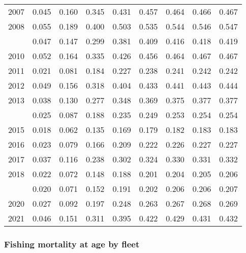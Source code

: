 \documentclass[
]{article}
\begin{document}
\begin{longtable}[t]{lrrrrrrrr}
2007 & 0.045 & 0.160 & 0.345 & 0.431 & 0.457 & 0.464 & 0.466 & 0.467\\
2008 & 0.055 & 0.189 & 0.400 & 0.503 & 0.535 & 0.544 & 0.546 & 0.547\\
\addlinespace
2009 & 0.047 & 0.147 & 0.299 & 0.381 & 0.409 & 0.416 & 0.418 & 0.419\\
2010 & 0.052 & 0.164 & 0.335 & 0.426 & 0.456 & 0.464 & 0.467 & 0.467\\
2011 & 0.021 & 0.081 & 0.184 & 0.227 & 0.238 & 0.241 & 0.242 & 0.242\\
2012 & 0.049 & 0.156 & 0.318 & 0.404 & 0.433 & 0.441 & 0.443 & 0.444\\
2013 & 0.038 & 0.130 & 0.277 & 0.348 & 0.369 & 0.375 & 0.377 & 0.377\\
\addlinespace
2014 & 0.025 & 0.087 & 0.188 & 0.235 & 0.249 & 0.253 & 0.254 & 0.254\\
2015 & 0.018 & 0.062 & 0.135 & 0.169 & 0.179 & 0.182 & 0.183 & 0.183\\
2016 & 0.023 & 0.079 & 0.166 & 0.209 & 0.222 & 0.226 & 0.227 & 0.227\\
2017 & 0.037 & 0.116 & 0.238 & 0.302 & 0.324 & 0.330 & 0.331 & 0.332\\
2018 & 0.022 & 0.072 & 0.148 & 0.188 & 0.201 & 0.204 & 0.205 & 0.206\\
\addlinespace
2019 & 0.020 & 0.071 & 0.152 & 0.191 & 0.202 & 0.206 & 0.206 & 0.207\\
2020 & 0.027 & 0.092 & 0.197 & 0.248 & 0.263 & 0.267 & 0.268 & 0.269\\
2021 & 0.046 & 0.151 & 0.311 & 0.395 & 0.422 & 0.429 & 0.431 & 0.432\\*
\end{longtable}

\hypertarget{fishing-mortality-at-age-by-fleet}{%
\subsubsection{Fishing mortality at age by
fleet}\label{fishing-mortality-at-age-by-fleet}}
\end{document}
